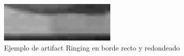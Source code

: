\begin{figure}[htb]
\begin{center}
       \includegraphics[width=0.5\textwidth]{imagenes/ringing_example.jpg}
       \caption{Ejemplo de artifact Ringing en borde recto y redondeado}
       \end{center}

\end{figure}

